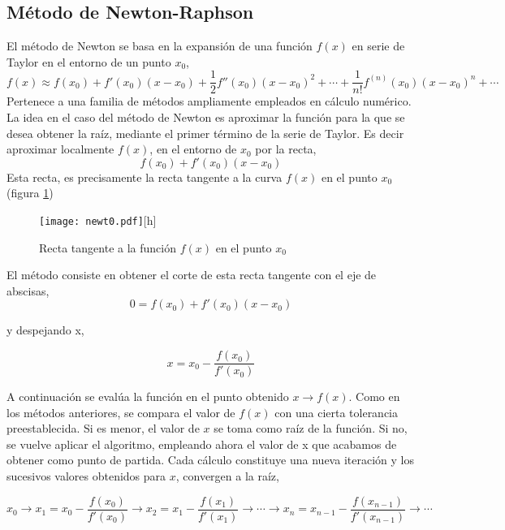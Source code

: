 \subsection{Método de Newton-Raphson}
El método de Newton se basa en la expansión de una función $f(x)$ en serie de Taylor en el entorno de un punto $x_0$,
\begin{equation*}
f(x)\approx f(x_0)+f'(x_0)(x-x_0)+\frac{1}{2}f''(x_0)(x-x_0)^2+\cdots+\frac{1}{n!}f^{(n)}(x_0)(x-x_0)^n+\cdots
\end{equation*}
 Pertenece a una familia de métodos ampliamente empleados en cálculo numérico. La idea en el caso del método de Newton es aproximar la función para la que se desea obtener la raíz, mediante el primer término de la serie de Taylor. Es decir aproximar localmente $f(x)$, en el entorno de $x_0$ por la recta,
\begin{equation*}
 f(x_0)+f'(x_0)(x-x_0)
\end{equation*}
Esta recta, es precisamente la recta tangente a la curva $f(x)$ en el punto $x_0$ (figura \ref{fig:newton1})
\begin{figure}[h]
\centering
\texttt{[image: newt0.pdf]}[h]
\caption{Recta tangente a la función $f(x)$ en el punto $x_0$}
\label{fig:newton1}
\end{figure}

El método consiste en obtener el corte de esta recta tangente con el eje de abscisas,
\begin{equation*}
0= f(x_0)+f'(x_0)(x-x_0)
\end{equation*}

y despejando x,

\begin{equation*}
x=x_0-\frac{f(x_0)}{f'(x_0)}
\end{equation*}

A continuación se evalúa la función en el punto obtenido $x\rightarrow f(x)$. Como en los métodos anteriores, se compara el valor de $f(x)$ con una cierta tolerancia preestablecida. Si es menor, el valor de $x$ se toma como raíz de la función. Si no, se vuelve aplicar el algoritmo, empleando ahora el valor de x que acabamos de obtener como punto de partida. Cada cálculo constituye una nueva iteración y los sucesivos valores obtenidos para $x$, convergen a la raíz,

\begin{equation*}
x_0\rightarrow x_1=x_0-\frac{f(x_0)}{f'(x_0)}\rightarrow x_2=x_1-\frac{f(x_1)}{f'(x_1)}\rightarrow  \cdots \rightarrow x_n=x_{n-1}-\frac{f(x_{n-1})}{f'(x_{n-1})}\rightarrow \cdots
\end{equation*}

